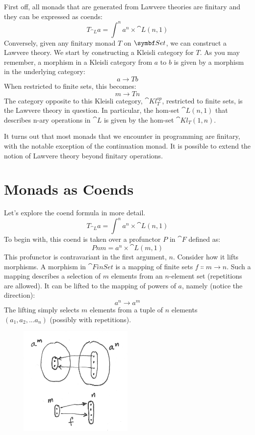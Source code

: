First off, all monads that are generated from Lawvere theories are
finitary and they can be expressed as coends:
\[T_{\cat{L}} a = \int^n a^n \times \cat{L}(n, 1)\]
Conversely, given any finitary monad $T$ on $\Set$, we can
construct a Lawvere theory. We start by constructing a Kleisli category
for $T$. As you may remember, a morphism in a Kleisli category
from $a$ to $b$ is given by a morphism in the underlying
category:
\[a \to T b\]
When restricted to finite sets, this becomes:
\[m \to T n\]
The category opposite to this Kleisli category,
$\cat{Kl}^\mathit{op}_{T}$, restricted to finite
sets, is the Lawvere theory in question. In particular, the hom-set
$\cat{L}(n, 1)$ that describes n-ary operations in $\cat{L}$ is given
by the hom-set $\cat{Kl}_{T}(1, n)$.

It turns out that most monads that we encounter in programming are
finitary, with the notable exception of the continuation monad. It is
possible to extend the notion of Lawvere theory beyond finitary
operations.

\section{Monads as Coends}

Let's explore the coend formula in more detail.
\[T_{\cat{L}} a = \int^n a^n \times \cat{L}(n, 1)\]
To begin with, this coend is taken over a profunctor $P$ in
$\cat{F}$ defined as:
\[P n m = a^n \times \cat{L}(m, 1)\]
This profunctor is contravariant in the first argument, $n$.
Consider how it lifts morphisms. A morphism in $\cat{FinSet}$ is a
mapping of finite sets $f \Colon m \to n$. Such a
mapping describes a selection of $m$ elements from an $n$-element set
(repetitions are allowed). It can be lifted to the mapping of powers of
$a$, namely (notice the direction):
\[a^n \to a^m\]
The lifting simply selects $m$ elements from a tuple of $n$ elements\\
$(a_1, a_2,...a_n)$ (possibly with repetitions).

\begin{figure}[H]
  \centering
  \includegraphics[width=0.5\textwidth]{images/liftpower.png}
\end{figure}

